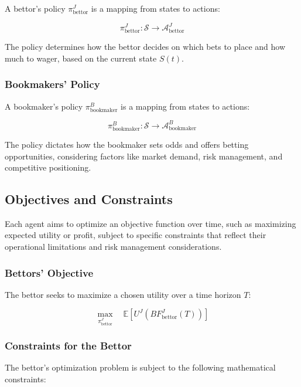 A bettor's policy \( \pi_{\text{bettor}}^J \) is a mapping from states to actions:

\[
\pi_{\text{bettor}}^J: \mathcal{S} \rightarrow \mathcal{A}_{\text{bettor}}^J
\]

The policy determines how the bettor decides on which bets to place and how much to wager, based on the current state \( S(t) \).

\subsubsection{Bookmakers' Policy}

A bookmaker's policy \( \pi_{\text{bookmaker}}^B \) is a mapping from states to actions:

\[
\pi_{\text{bookmaker}}^B: \mathcal{S} \rightarrow \mathcal{A}_{\text{bookmaker}}^B
\]

The policy dictates how the bookmaker sets odds and offers betting opportunities, considering factors like market demand, risk management, and competitive positioning.

\subsection{Objectives and Constraints}

Each agent aims to optimize an objective function over time, such as maximizing expected utility or profit, subject to specific constraints that reflect their operational limitations and risk management considerations.

\subsubsection{Bettors' Objective}

The bettor seeks to maximize a chosen utility over a time horizon \( T \):

\[
\max_{\pi_{\text{bettor}}^J} \quad \mathbb{E} \left[ U^{J} \left( BF_{\text{bettor}}^J(T) \right) \right]
\]

\subsubsection{Constraints for the Bettor}

The bettor's optimization problem is subject to the following mathematical constraints: 

